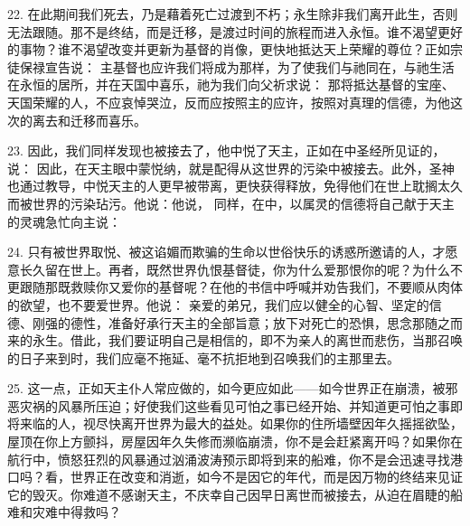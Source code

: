 22. 在此期间我们死去，乃是藉着死亡过渡到不朽；永生除非我们离开此生，否则无法跟随。那不是终结，而是迁移，是渡过时间的旅程而进入永恒。谁不渴望更好的事物？谁不渴望改变并更新为基督的肖像，更快地抵达天上荣耀的尊位？正如宗徒保禄宣告说： 主基督也应许我们将成为那样，为了使我们与祂同在，与祂生活在永恒的居所，并在天国中喜乐，祂为我们向父祈求说： 那将抵达基督的宝座、天国荣耀的人，不应哀悼哭泣，反而应按照主的应许，按照对真理的信德，为他这次的离去和迁移而喜乐。\par

23. 因此，我们同样发现也被接去了，他中悦了天主，正如在中圣经所见证的，说： 因此，在天主眼中蒙悦纳，就是配得从这世界的污染中被接去。此外，圣神也通过教导，中悦天主的人更早被带离，更快获得释放，免得他们在世上耽搁太久而被世界的污染玷污。他说：他说， 同样，在中，以属灵的信德将自己献于天主的灵魂急忙向主说：\par

24. 只有被世界取悦、被这谄媚而欺骗的生命以世俗快乐的诱惑所邀请的人，才愿意长久留在世上。再者，既然世界仇恨基督徒，你为什么爱那恨你的呢？为什么不更跟随那既救赎你又爱你的基督呢？在他的书信中呼喊并劝告我们，不要顺从肉体的欲望，也不要爱世界。他说： 亲爱的弟兄，我们应以健全的心智、坚定的信德、刚强的德性，准备好承行天主的全部旨意；放下对死亡的恐惧，思念那随之而来的永生。借此，我们要证明自己是相信的，即不为亲人的离世而悲伤，当那召唤的日子来到时，我们应毫不拖延、毫不抗拒地到召唤我们的主那里去。\par

25. 这一点，正如天主仆人常应做的，如今更应如此——如今世界正在崩溃，被邪恶灾祸的风暴所压迫；好使我们这些看见可怕之事已经开始、并知道更可怕之事即将来临的人，视尽快离开世界为最大的益处。如果你的住所墙壁因年久摇摇欲坠，屋顶在你上方颤抖，房屋因年久失修而濒临崩溃，你不是会赶紧离开吗？如果你在航行中，愤怒狂烈的风暴通过汹涌波涛预示即将到来的船难，你不是会迅速寻找港口吗？看，世界正在改变和消逝，如今不是因它的年代，而是因万物的终结来见证它的毁灭。你难道不感谢天主，不庆幸自己因早日离世而被接去，从迫在眉睫的船难和灾难中得救吗？\par

